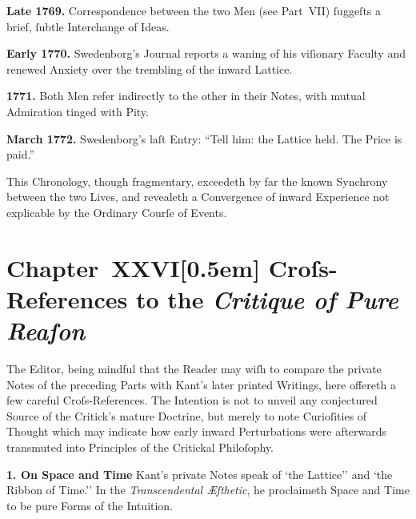 \documentclass[12pt]{book}
\begin{document}
\medskip

\noindent\textbf{Late 1769.}
Correspondence between the two Men (see Part~VII) ſuggeſts a brief, ſubtle Interchange of Ideas.

\medskip

\noindent\textbf{Early 1770.}
Swedenborg’s Journal reports a waning of his viſionary Faculty and renewed Anxiety over the trembling of the inward Lattice.

\medskip

\noindent\textbf{1771.}
Both Men refer indirectly to the other in their Notes, with mutual Admiration tinged with Pity.

\medskip

\noindent\textbf{March 1772.}
Swedenborg’s laſt Entry: ``Tell him: the Lattice held. The Price is paid.''

\medskip

\noindent This Chronology, though fragmentary, exceedeth by far the known Synchrony between the two Lives, and revealeth a Convergence of inward Experience not explicable by the Ordinary Courſe of Events.


\chapter*{Chapter~XXVI[0.5em]
Croſs-References to the \textit{Critique of Pure Reaſon}}


The Editor, being mindful that the Reader may wiſh to compare the private Notes of the preceding Parts with Kant’s later printed Writings, here offereth a few careful Croſs-References. The Intention is not to unveil any conjectured Source of the Critick’s mature Doctrine, but merely to note Curioſities of Thought which may indicate how early inward Perturbations were afterwards transmuted into Principles of the Critickal Philoſophy.

\medskip

\noindent\textbf{1. On Space and Time}
Kant’s private Notes speak of `the Lattice'' and `the Ribbon of Time.'' In the \textit{Transcendental Æſthetic}, he proclaimeth Space and Time to be pure Forms of the Intuition.

\medskip
\end{document}
